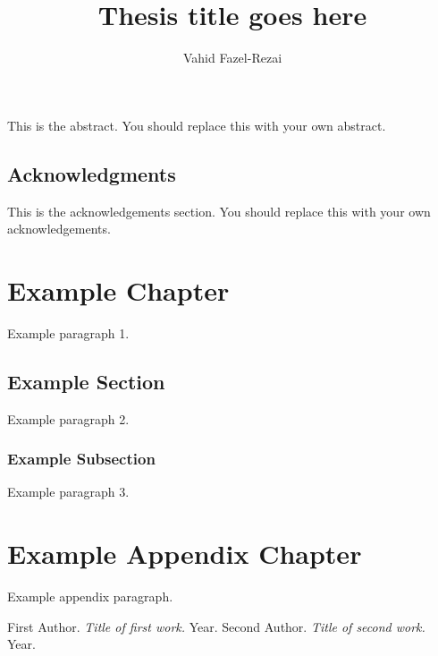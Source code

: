 \documentclass[12pt,twoside,vi]{mitthesis}
\begin{document}
\title{Thesis title goes here}
\author{Vahid Fazel-Rezai}
\maketitle
\cleardoublepage
\setcounter{savepage}{\thepage}
\begin{abstractpage}
This is the abstract.  You should replace this with your own abstract.
\end{abstractpage}
\cleardoublepage
\section*{Acknowledgments}
This is the acknowledgements section.  You should replace this with your own acknowledgements.
\tableofcontents
\newpage
\listoffigures
\newpage
\listoftables
\chapter{Example Chapter}
Example paragraph 1. \cite{refkey1}
\section{Example Section}
Example paragraph 2.
\subsection{Example Subsection}
Example paragraph 3. \cite{refkey2}
\appendix
\chapter{Example Appendix Chapter}
Example appendix paragraph.
\clearpage
\newpage
\begin{singlespace}\begin{thebibliography}{}
 First Author. {\emph{Title of first work.}} Year.
 Second Author. {\emph{Title of second work.}} Year.
\end{thebibliography}\end{singlespace}
\end{document}
